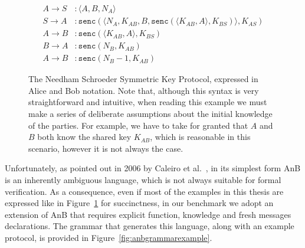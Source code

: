 \begin{figure}[htbp]
    \centering
    \begin{align*}
        A \to S &: \langle A, B, N_A \rangle\\
        S \to A &: \texttt{senc}(\langle N_A, K_{AB}, B, \texttt{senc}(\langle K_{AB}, A \rangle, K_{BS}) \rangle, K_{AS})\\
        A \to B &: \texttt{senc}(\langle K_{AB}, A \rangle, K_{BS})\\
        B \to A &: \texttt{senc}(N_B, K_{AB})\\
        A \to B &: \texttt{senc}(N_B - 1, K_{AB})
    \end{align*}
    \caption{The Needham Schroeder Symmetric Key Protocol, expressed in Alice and Bob notation. Note that, although this syntax is very straightforward and intuitive, when reading this example we must make a series of deliberate assumptions about the initial knowledge of the parties. For example, we have to take for granted that $A$ and $B$ both know the shared key $K_{AB}$, which is reasonable in this scenario, however it is not always the case.}
    \label{fig:needhamschroedersimplified}
\end{figure}

Unfortunately, as pointed out in 2006 by Caleiro et al.~\cite{anbsemantics}, in its simplest form AnB is an inherently ambiguous language, which is not always suitable for formal verification. As a consequence, even if most of the examples in this thesis are expressed like in Figure~\ref{fig:needhamschroedersimplified} for succinctness, in our benchmark we adopt an extension of AnB that requires explicit function, knowledge and fresh messages declarations. The grammar that generates this language, along with an example protocol, is provided in Figure~\ref{fig:anbgrammarexample}.

